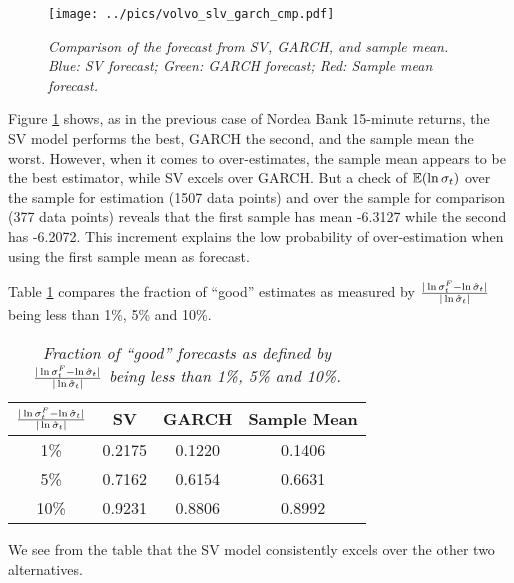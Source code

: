 \begin{figure}[htb!]
  \centering
    \texttt{[image: ../pics/volvo\_slv\_garch\_cmp.pdf]}
    \label{fig:volvo_slv_garch_cmp}
  \caption{\small \it Comparison of the forecast from SV, GARCH,
    and sample mean. Blue: SV forecast; Green: GARCH forecast; Red:
    Sample mean forecast.}
\end{figure}
Figure \ref{fig:volvo_slv_garch_cmp} shows, as in the previous case of
Nordea Bank 15-minute returns, the SV model performs the best, GARCH
the second, and the sample mean the worst. However, when it comes to
over-estimates, the sample mean appears to be the best estimator,
while SV excels over GARCH. But a check of $\mathbb{E}(\ln\sigma_t)$ over
the sample for estimation (1507 data points) and over the sample for
comparison (377 data points) reveals that the first sample has mean
-6.3127 while the second has -6.2072. This increment explains the low
probability of over-estimation when using the first sample mean as
forecast. 

Table \ref{tab:volvo_good_percentage} compares the fraction of
``good'' estimates as measured by ${|\ln\sigma^F_t -
  \ln\hat{\sigma}_t| \over |\ln \hat{\sigma}_t|}$ being less than 1\%,
5\% and 10\%.
\begin{table}[htb!]
  \centering
  \begin{tabular}{|c|c|c|c|}
    \hline
    ${|\ln \sigma^F_t - \ln \hat{\sigma}_t| \over |\ln
      \hat{\sigma}_t|}$ &
    SV & GARCH & Sample Mean \\
    \hline
    1\% & 0.2175 & 0.1220 & 0.1406 \\
    \hline
    5\% & 0.7162 & 0.6154 & 0.6631 \\
    \hline
    10\% & 0.9231 & 0.8806 & 0.8992 \\
    \hline
  \end{tabular}
  \caption{\small \it Fraction of ``good'' forecasts as defined by
    ${|\ln \sigma^F_t - \ln \hat{\sigma}_t| \over |\ln
      \hat{\sigma}_t|}$ being less than 1\%, 5\% and 10\%.}
  \label{tab:volvo_good_percentage}
\end{table}
We see from the table that the SV model consistently excels over
the other two alternatives.

